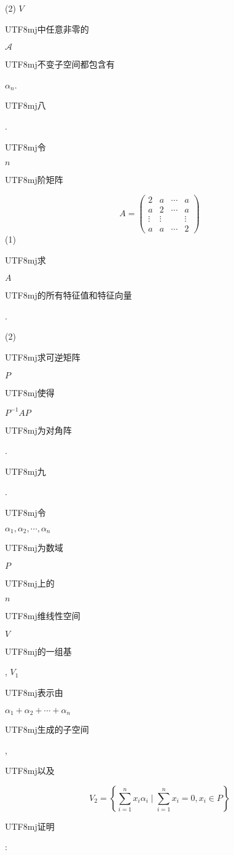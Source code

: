 \documentclass[10pt]{article}
\begin{document}
(2) $V$ \begin{CJK}{UTF8}{mj}中任意非零的\end{CJK} $\mathscr{A}$ \begin{CJK}{UTF8}{mj}不变子空间都包含有\end{CJK} $\alpha_{n}$.

\begin{CJK}{UTF8}{mj}八\end{CJK}. \begin{CJK}{UTF8}{mj}令\end{CJK} $n$ \begin{CJK}{UTF8}{mj}阶矩阵\end{CJK}
$$
A=\left(\begin{array}{cccc}
2 & a & \cdots & a \\
a & 2 & \cdots & a \\
\vdots & \vdots & & \vdots \\
a & a & \cdots & 2
\end{array}\right)
$$
(1) \begin{CJK}{UTF8}{mj}求\end{CJK} $A$ \begin{CJK}{UTF8}{mj}的所有特征值和特征向量\end{CJK}.

(2) \begin{CJK}{UTF8}{mj}求可逆矩阵\end{CJK} $P$ \begin{CJK}{UTF8}{mj}使得\end{CJK} $P^{-1} A P$ \begin{CJK}{UTF8}{mj}为对角阵\end{CJK}.

\begin{CJK}{UTF8}{mj}九\end{CJK}. \begin{CJK}{UTF8}{mj}令\end{CJK} $\alpha_{1}, \alpha_{2}, \cdots, \alpha_{n}$ \begin{CJK}{UTF8}{mj}为数域\end{CJK} $P$ \begin{CJK}{UTF8}{mj}上的\end{CJK} $n$ \begin{CJK}{UTF8}{mj}维线性空间\end{CJK} $V$ \begin{CJK}{UTF8}{mj}的一组基\end{CJK}, $V_{1}$ \begin{CJK}{UTF8}{mj}表示由\end{CJK} $\alpha_{1}+\alpha_{2}+\cdots+\alpha_{n}$ \begin{CJK}{UTF8}{mj}生成的子空间\end{CJK}, \begin{CJK}{UTF8}{mj}以及\end{CJK}
$$
V_{2}=\left\{\sum_{i=1}^{n} x_{i} \alpha_{i} \mid \sum_{i=1}^{n} x_{i}=0, x_{i} \in P\right\}
$$
\begin{CJK}{UTF8}{mj}证明\end{CJK}:
\end{document}
